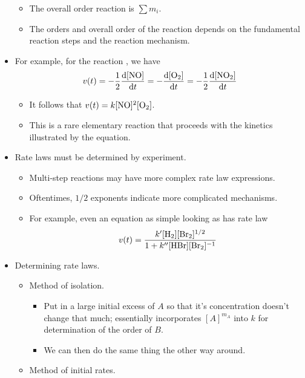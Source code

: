 \documentclass[../notes.tex]{subfiles}
\begin{document}
\begin{itemize}
\begin{itemize}
        \item The overall order reaction is $\sum m_i$.
        \item The orders and overall order of the reaction depends on the fundamental reaction steps and the reaction mechanism.
    \end{itemize}
    \item For example, for the reaction , we have
    \begin{equation*}
        v(t) = -\frac{1}{2}\dv{[\ce{NO}]}{t}
        = -\dv{[\ce{O2}]}{t}
        = -\frac{1}{2}\dv{[\ce{NO2}]}{t}
    \end{equation*}
    \begin{itemize}
        \item It follows that $v(t)=k[\ce{NO}]^2[\ce{O2}]$.
        \item This is a rare elementary reaction that proceeds with the kinetics illustrated by the equation.
    \end{itemize}
    \item Rate laws must be determined by experiment.
    \begin{itemize}
        \item Multi-step reactions may have more complex rate law expressions.
        \item Oftentimes, $1/2$ exponents indicate more complicated mechanisms.
        \item For example, even an equation as simple looking as  has rate law
        \begin{equation*}
            v(t) = \frac{k'[\ce{H2}][\ce{Br2}]^{1/2}}{1+k''[\ce{HBr}][\ce{Br2}]^{-1}}
        \end{equation*}
    \end{itemize}
    \item Determining rate laws.
    \begin{itemize}
        \item Method of isolation.
        \begin{itemize}
            \item Put in a large initial excess of $A$ so that it's concentration doesn't change that much; essentially incorporates $[A]^{m_A}$ into $k$ for determination of the order of $B$.
            \item We can then do the same thing the other way around.
        \end{itemize}
        \item Method of initial rates.

\end{itemize}
\end{itemize}
\end{document}
